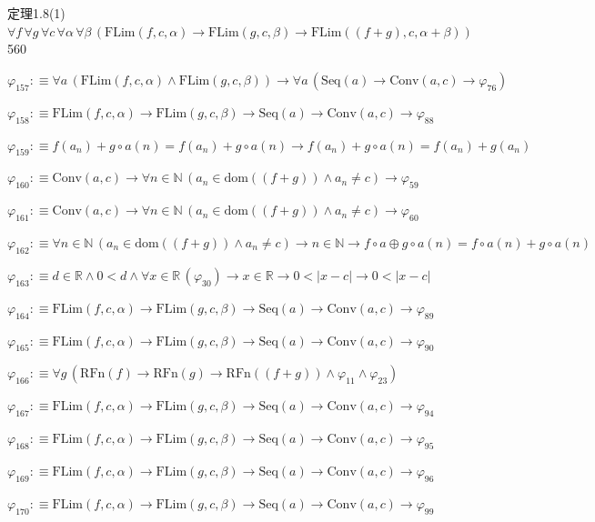 \begin{fullproof}{定理1.8(1)}{$\forall f\,\forall g\,\forall c\,\forall \alpha\,\forall \beta\,(\mathrm{FLim}(f,c,\alpha) \to \mathrm{FLim}(g,c,\beta) \to \mathrm{FLim}((f + g),c,\alpha + \beta))$}{560}
\begin{abbrevlist}
\item $\varphi_{157} :\equiv \forall a\,(\mathrm{FLim}(f,c,\alpha) \land \mathrm{FLim}(g,c,\beta)) \to \forall a\,(\mathrm{Seq}(a) \to \mathrm{Conv}(a,c) \to \varphi_{76})$
\item $\varphi_{158} :\equiv \mathrm{FLim}(f,c,\alpha) \to \mathrm{FLim}(g,c,\beta) \to \mathrm{Seq}(a) \to \mathrm{Conv}(a,c) \to \varphi_{88}$
\item $\varphi_{159} :\equiv f(a_{n}) + g \circ a(n) = f(a_{n}) + g \circ a(n) \to f(a_{n}) + g \circ a(n) = f(a_{n}) + g(a_{n})$
\item $\varphi_{160} :\equiv \mathrm{Conv}(a,c) \to \forall n \in \mathbb{N}\,(a_{n} \in \mathrm{dom}((f + g)) \land a_{n} \neq c) \to \varphi_{59}$
\item $\varphi_{161} :\equiv \mathrm{Conv}(a,c) \to \forall n \in \mathbb{N}\,(a_{n} \in \mathrm{dom}((f + g)) \land a_{n} \neq c) \to \varphi_{60}$
\item $\varphi_{162} :\equiv \forall n \in \mathbb{N}\,(a_{n} \in \mathrm{dom}((f + g)) \land a_{n} \neq c) \to n \in \mathbb{N} \to f \circ a \oplus g \circ a(n) = f \circ a(n) + g \circ a(n)$
\item $\varphi_{163} :\equiv d \in \mathbb{R} \land 0 < d \land \forall x \in \mathbb{R}\,(\varphi_{30}) \to x \in \mathbb{R} \to 0 < \lvert x - c \rvert \to 0 < \lvert x - c \rvert$
\item $\varphi_{164} :\equiv \mathrm{FLim}(f,c,\alpha) \to \mathrm{FLim}(g,c,\beta) \to \mathrm{Seq}(a) \to \mathrm{Conv}(a,c) \to \varphi_{89}$
\item $\varphi_{165} :\equiv \mathrm{FLim}(f,c,\alpha) \to \mathrm{FLim}(g,c,\beta) \to \mathrm{Seq}(a) \to \mathrm{Conv}(a,c) \to \varphi_{90}$
\item $\varphi_{166} :\equiv \forall g\,(\mathrm{RFn}(f) \to \mathrm{RFn}(g) \to \mathrm{RFn}((f + g)) \land \varphi_{11} \land \varphi_{23})$
\item $\varphi_{167} :\equiv \mathrm{FLim}(f,c,\alpha) \to \mathrm{FLim}(g,c,\beta) \to \mathrm{Seq}(a) \to \mathrm{Conv}(a,c) \to \varphi_{94}$
\item $\varphi_{168} :\equiv \mathrm{FLim}(f,c,\alpha) \to \mathrm{FLim}(g,c,\beta) \to \mathrm{Seq}(a) \to \mathrm{Conv}(a,c) \to \varphi_{95}$
\item $\varphi_{169} :\equiv \mathrm{FLim}(f,c,\alpha) \to \mathrm{FLim}(g,c,\beta) \to \mathrm{Seq}(a) \to \mathrm{Conv}(a,c) \to \varphi_{96}$
\item $\varphi_{170} :\equiv \mathrm{FLim}(f,c,\alpha) \to \mathrm{FLim}(g,c,\beta) \to \mathrm{Seq}(a) \to \mathrm{Conv}(a,c) \to \varphi_{99}$

\end{abbrevlist}
\end{fullproof}
